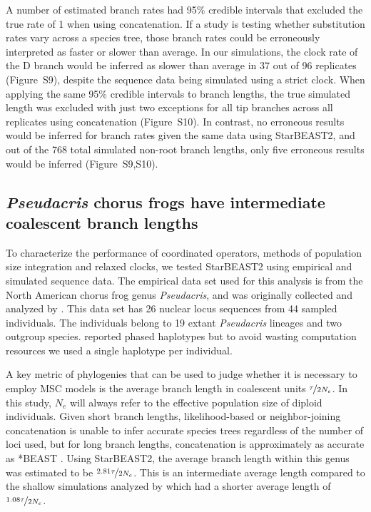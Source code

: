 \documentclass[12pt]{article}
\begin{document}
A number of estimated branch rates had 95\% credible intervals that excluded
the true rate of 1 when using concatenation. If a study is testing whether
substitution rates vary across a species tree, those branch rates could be
erroneously interpreted as faster or slower than average. In our simulations,
the clock rate of the D branch would be inferred as slower than average in 37
out of 96 replicates (Figure~S9), despite the sequence data being simulated
using a strict clock. When applying the same 95\% credible intervals to branch
lengths, the true simulated length was excluded with just two exceptions for
all tip branches across all replicates using concatenation (Figure~S10). In
contrast, no erroneous results would be inferred for branch rates given the
same data using StarBEAST2, and out of the 768 total simulated non-root branch
lengths, only five erroneous results would be inferred (Figure~S9,S10).

\subsection{\textit{Pseudacris} chorus frogs have intermediate coalescent branch lengths}

To characterize the performance of coordinated operators, methods of
population size integration and relaxed clocks, we tested StarBEAST2 using
empirical and simulated sequence data. The empirical data set used for this
analysis is from the North American chorus frog genus \textit{Pseudacris}, and
was originally collected and analyzed by \cite{Barrow201478}. This data set
has 26 nuclear locus sequences from 44 sampled individuals. The individuals
belong to 19 extant \textit{Pseudacris} lineages and two outgroup species.
\cite{Barrow201478} reported phased haplotypes but to avoid wasting
computation resources we used a single haplotype per individual.

A key metric of phylogenies that can be used to judge whether it is necessary
to employ MSC models is the average branch length in coalescent units
$\nicefrac{\tau}{2N_e}$. In this study, $N_e$ will always refer to the
effective population size of diploid individuals. Given short branch lengths,
likelihood-based or neighbor-joining concatenation is unable to infer accurate
species trees regardless of the number of loci used, but for long branch
lengths, concatenation is approximately as accurate as *BEAST
\citep{Ogilvie01052016}. Using StarBEAST2, the average branch length within
this genus was estimated to be $\nicefrac{2.81\tau}{2N_e}$. This is an
intermediate average length compared to the shallow simulations analyzed by
\cite{Ogilvie01052016} which had a shorter average length of
$\nicefrac{1.08\tau}{2N_e}$.
\end{document}
